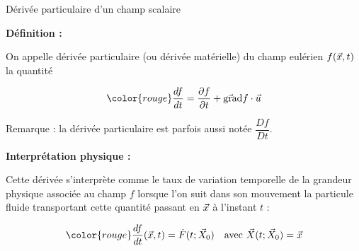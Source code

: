 \begin{frame}{Dérivée particulaire d'un champ scalaire}

\small

\textbf{Définition :} \medskip

On appelle \textcolor{vert}{dérivée particulaire} (ou dérivée matérielle) 
du champ eulérien $f(\vec{x}, t)$ la quantité

\[
	\color{rouge}
	\ddt{f} 
	=
	\dpdt{f} +  \gradient f \cdot \myvec{u}
\]

\medskip

Remarque : la dérivée particulaire est parfois aussi notée $\dfrac{Df}{Dt}$.

\bigskip
\pause

\textbf{Interprétation physique :} \medskip

Cette dérivée s'interprète comme le taux de variation temporelle de la grandeur physique associée au champ $f$ lorsque l'on suit dans son mouvement la particule fluide transportant cette quantité 
passant en $\vec{x}$ à l'instant $t$ :

\[
	{\color{rouge}
	\ddt{f}(\myvec{x},t) = \dot{F}(t; \myvec{X}_0)}
	\quad \mbox{avec $\myvec{X}(t; \myvec{X}_0) = \myvec{x}$} 
\]

\vspace{20mm}

\end{frame}
